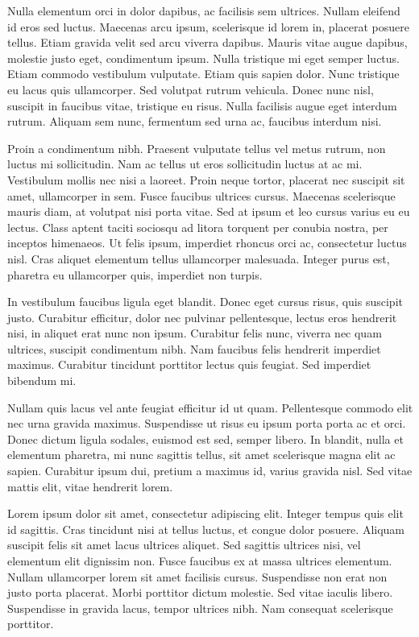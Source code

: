 Nulla elementum orci in dolor dapibus, ac facilisis sem ultrices. Nullam eleifend id eros sed luctus. Maecenas arcu ipsum, scelerisque id lorem in, placerat posuere tellus. Etiam gravida velit sed arcu viverra dapibus. Mauris vitae augue dapibus, molestie justo eget, condimentum ipsum. Nulla tristique mi eget semper luctus. Etiam commodo vestibulum vulputate. Etiam quis sapien dolor. Nunc tristique eu lacus quis ullamcorper. Sed volutpat rutrum vehicula. Donec nunc nisl, suscipit in faucibus vitae, tristique eu risus. Nulla facilisis augue eget interdum rutrum. Aliquam sem nunc, fermentum sed urna ac, faucibus interdum nisi.

Proin a condimentum nibh. Praesent vulputate tellus vel metus rutrum, non luctus mi sollicitudin. Nam ac tellus ut eros sollicitudin luctus at ac mi. Vestibulum mollis nec nisi a laoreet. Proin neque tortor, placerat nec suscipit sit amet, ullamcorper in sem. Fusce faucibus ultrices cursus. Maecenas scelerisque mauris diam, at volutpat nisi porta vitae. Sed at ipsum et leo cursus varius eu eu lectus. Class aptent taciti sociosqu ad litora torquent per conubia nostra, per inceptos himenaeos. Ut felis ipsum, imperdiet rhoncus orci ac, consectetur luctus nisl. Cras aliquet elementum tellus ullamcorper malesuada. Integer purus est, pharetra eu ullamcorper quis, imperdiet non turpis.

In vestibulum faucibus ligula eget blandit. Donec eget cursus risus, quis suscipit justo. Curabitur efficitur, dolor nec pulvinar pellentesque, lectus eros hendrerit nisi, in aliquet erat nunc non ipsum. Curabitur felis nunc, viverra nec quam ultrices, suscipit condimentum nibh. Nam faucibus felis hendrerit imperdiet maximus. Curabitur tincidunt porttitor lectus quis feugiat. Sed imperdiet bibendum mi.

Nullam quis lacus vel ante feugiat efficitur id ut quam. Pellentesque commodo elit nec urna gravida maximus. Suspendisse ut risus eu ipsum porta porta ac et orci. Donec dictum ligula sodales, euismod est sed, semper libero. In blandit, nulla et elementum pharetra, mi nunc sagittis tellus, sit amet scelerisque magna elit ac sapien. Curabitur ipsum dui, pretium a maximus id, varius gravida nisl. Sed vitae mattis elit, vitae hendrerit lorem. 





Lorem ipsum dolor sit amet, consectetur adipiscing elit. Integer tempus quis elit id sagittis. Cras tincidunt nisi at tellus luctus, et congue dolor posuere. Aliquam suscipit felis sit amet lacus ultrices aliquet. Sed sagittis ultrices nisi, vel elementum elit dignissim non. Fusce faucibus ex at massa ultrices elementum. Nullam ullamcorper lorem sit amet facilisis cursus. Suspendisse non erat non justo porta placerat. Morbi porttitor dictum molestie. Sed vitae iaculis libero. Suspendisse in gravida lacus, tempor ultrices nibh. Nam consequat scelerisque porttitor.

